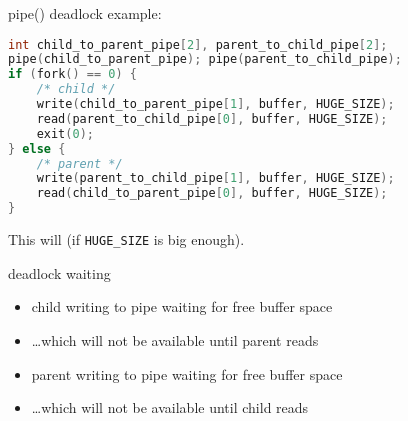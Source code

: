 \usetikzlibrary{arrows.meta,shapes.geometric}

\begin{frame}[fragile,label=pipeDeadlock]{pipe() deadlock}
 example:
\begin{lstlisting}[language=C++,style=small]
int child_to_parent_pipe[2], parent_to_child_pipe[2];
pipe(child_to_parent_pipe); pipe(parent_to_child_pipe);
if (fork() == 0) {
    /* child */
    write(child_to_parent_pipe[1], buffer, HUGE_SIZE);
    read(parent_to_child_pipe[0], buffer, HUGE_SIZE);
    exit(0);
} else {
    /* parent */
    write(parent_to_child_pipe[1], buffer, HUGE_SIZE);
    read(child_to_parent_pipe[0], buffer, HUGE_SIZE);
}
\end{lstlisting}
This will  (if \texttt{HUGE\_SIZE} is big enough).
\end{frame}

\begin{frame}{deadlock waiting}
\begin{itemize}
\item child writing to pipe waiting for free buffer space
\item \ldots which will not be available until parent reads
\vspace{.5cm}
\item parent writing to pipe waiting for free buffer space
\item \ldots which will not be available until child reads
\end{itemize}
\end{frame}

